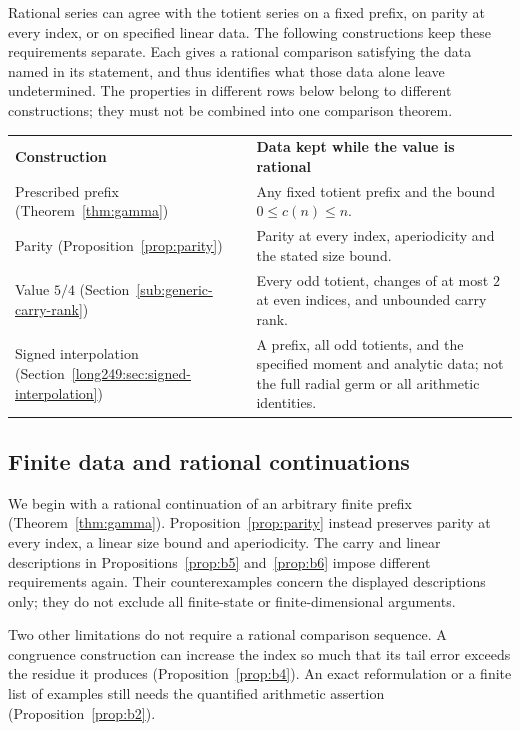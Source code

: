 Rational series can agree with the totient series on a fixed prefix,
on parity at every index, or on specified linear data. The following
constructions keep these requirements separate. Each gives a rational
comparison satisfying the data named in its statement, and thus
identifies what those data alone leave undetermined.
The properties in different rows below belong to different constructions;
they must not be combined into one comparison theorem.
\begin{center}
\begin{tabular}{@{}p{.29\linewidth}p{.65\linewidth}@{}}
\textbf{Construction} & \textbf{Data kept while the value is rational}\\[3pt]
Prescribed prefix (Theorem~\ref{thm:gamma}) &
Any fixed totient prefix and the bound $0\le c(n)\le n$.\\[3pt]
Parity (Proposition~\ref{prop:parity}) &
Parity at every index, aperiodicity and the stated size bound.\\[3pt]
Value $5/4$ (Section~\ref{sub:generic-carry-rank}) &
Every odd totient, changes of at most $2$ at even indices, and unbounded carry rank.\\[3pt]
Signed interpolation (Section~\ref{long249:sec:signed-interpolation}) &
A prefix, all odd totients, and the specified moment and analytic data;
not the full radial germ or all arithmetic identities.
\end{tabular}
\end{center}

\subsection{Finite data and rational continuations}

We begin with a rational continuation of an arbitrary finite prefix
(Theorem~\ref{thm:gamma}). Proposition~\ref{prop:parity} instead
preserves parity at every index, a linear size bound and aperiodicity.
The carry and linear descriptions in Propositions~\ref{prop:b5}
and~\ref{prop:b6} impose different requirements again. Their
counterexamples concern the displayed descriptions only; they do not
exclude all finite-state or finite-dimensional arguments.

Two other limitations do not require a rational comparison sequence.
A congruence construction can increase the index so much that its tail
error exceeds the residue it produces (Proposition~\ref{prop:b4}). An exact
reformulation or a finite list of examples still needs the quantified
arithmetic assertion (Proposition~\ref{prop:b2}).

